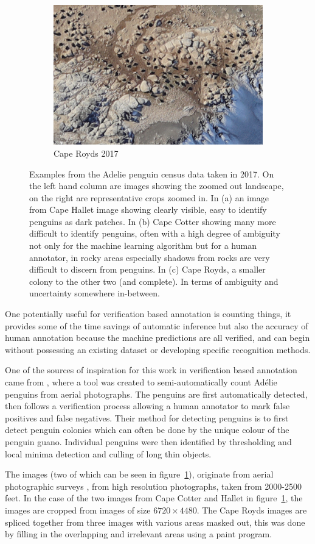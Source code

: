 \begin{figure}[H]
\begin{subfigure}[t]{1.0\linewidth}
  \hfill
  \includegraphics[width=0.475\linewidth]{figures/annotation/penguin/royds.jpg}
  \caption{Cape Royds 2017}
\end{subfigure}

\caption{Examples from the Adelie penguin census data taken in 2017. On the left hand column are images showing the zoomed out landscape, on the right are representative crops zoomed in.  In (a) an image from Cape Hallet image showing clearly visible, easy to identify penguins as dark patches. In (b) Cape Cotter showing many more difficult to identify penguins, often with a high degree of ambiguity not only for the machine learning algorithm but for a human annotator, in rocky areas especially shadows from rocks are very difficult to discern from penguins. In (c) Cape Royds, a smaller colony to the other two (and complete). In terms of ambiguity and uncertainty somewhere in-between. }
\label {fig:penguin_examples}
\end{figure}


One potentially useful for verification based annotation is counting things, it provides some of the time savings of automatic inference but also the accuracy of human annotation because the machine predictions are all verified, and can begin without possessing an existing dataset or developing specific recognition methods. 

One of the sources of inspiration for this work in verification based annotation came from \cite{McNeill2011}, where a tool was created to semi-automatically count Adélie penguins from aerial photographs. The penguins are first automatically detected, then follows a verification process allowing a human annotator to mark false positives and false negatives. Their method for detecting penguins is to first detect penguin colonies which can often be done by the unique colour of the penguin guano. Individual penguins were then identified by thresholding and local minima detection and culling of long thin objects. 

The images (two of which can be seen in figure~\ref{fig:penguin_examples}), originate from aerial photographic surveys \cite{Lyver2014}, from high resolution photographs, taken from 2000-2500 feet. In the case of the two images from Cape Cotter and Hallet in figure~\ref{fig:penguin_examples}, the images are cropped from images of size $ 6720\times4480 $. The Cape Royds images are spliced together from three images with various areas masked out, this was done by filling in the overlapping and irrelevant areas using a paint program.


